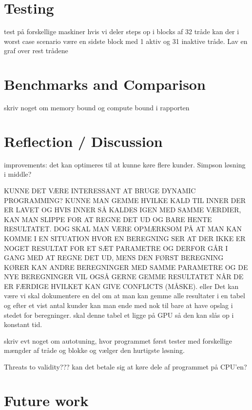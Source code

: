 \documentclass[oribibl]{llncs}
\begin{document}
	
	\label{cuda}
		
	\section{Testing}
	test på forskellige maskiner
	hvis vi deler steps op i blocks af 32 tråde kan der i worst case scenario være en sidste block med 1 aktiv og 31 inaktive tråde.
	Lav en graf over rest trådene
		
	
	\label{testing}
		
	\section{Benchmarks and Comparison}
		skriv noget om memory bound og compute bound i rapporten
	
	\label{bandc}
	
	\section{Reflection / Discussion}
	improvements:
	det kan optimeres til at kunne køre flere kunder.
	Simpson løsning i middle?
	
	KUNNE DET VÆRE INTERESSANT AT BRUGE DYNAMIC PROGRAMMING?
	KUNNE MAN GEMME HVILKE KALD TIL INNER DER ER LAVET OG HVIS INNER SÅ KALDES IGEN MED SAMME VÆRDIER, KAN MAN SLIPPE FOR AT REGNE DET UD OG BARE HENTE RESULTATET. DOG SKAL MAN VÆRE OPMÆRKSOM PÅ AT MAN KAN KOMME I EN SITUATION HVOR EN BEREGNING SER AT DER IKKE ER NOGET RESULTAT FOR ET SÆT PARAMETRE OG DERFOR GÅR I GANG MED AT REGNE DET UD, MENS DEN FØRST BEREGNING KØRER KAN ANDRE BEREGNINGER MED SAMME PARAMETRE OG DE NYE BEREGNINGER VIL OGSÅ GERNE GEMME RESULTATET NÅR DE ER FÆRDIGE HVILKET KAN GIVE CONFLICTS (MÅSKE).
	eller
	Det kan være vi skal dokumentere en del om at man kan gemme alle resultater i en tabel og efter et vist antal kunder kan man ende med nok til bare at have opslag i stedet for beregninger. skal denne tabel et ligge på GPU så den kan slås op i konstant tid.
		
		skriv evt noget om autotuning, hvor programmet først tester med forskellige mængder af tråde og blokke og vælger den hurtigste løsning.
		
		Threats to validity???
		kan det betale sig at køre dele af programmet på CPU'en?
		
	
	\label{reflection}
		
	\section{Future work}
	
\end{document}
